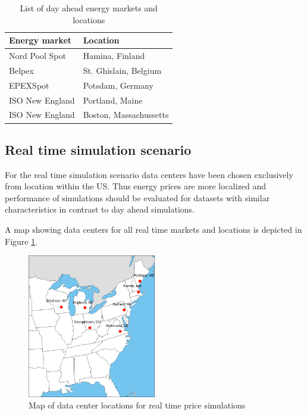 \begin{table}[htbp]
\centering
\begin{tabular}{ll}
\toprule
 Energy market & Location \\
\midrule
	Nord Pool Spot &  Hamina, Finland \\
	Belpex &  St. Ghislain, Belgium \\
	EPEXSpot &  Potsdam, Germany \\
	ISO New England &  Portland, Maine \\
	ISO New England &  Boston, Massachussetts \\
\bottomrule
\end{tabular}
\caption{List of day ahead energy markets and locations}
\label{tab:list_of_day_ahead_markets}
\end{table}




\subsection{Real time simulation scenario}

For the real time simulation scenario data centers have been chosen exclusively from location within the US. Thus energy prices are more localized and performance of simulations should be evaluated for datasets with similar characteristics in contrast to day ahead simulations. 

A map showing data centers for all real time markets and locations is depicted in Figure \ref{fig:usa_map}. 

\begin{figure}[htbp]
	\centering
		\includegraphics[width=0.50\textwidth]{figures/evaluation_and_results/usa_map.png}
	\caption{Map of data center locations for real time price simulations}
	\label{fig:usa_map}
\end{figure}

